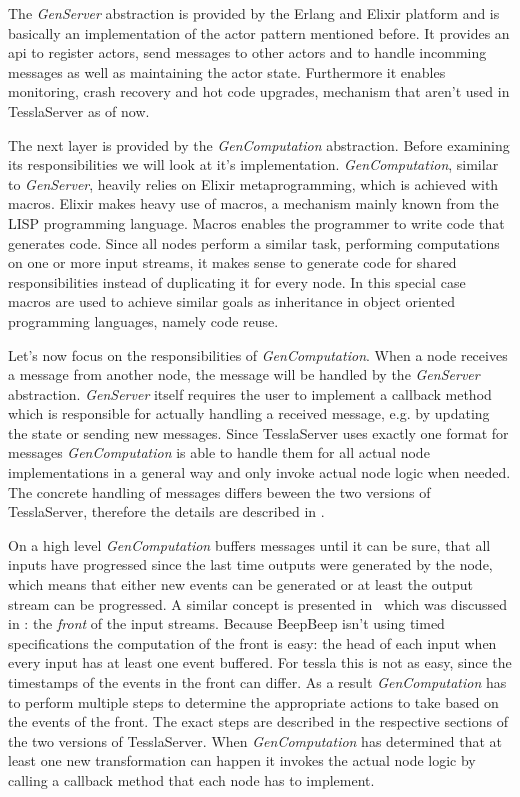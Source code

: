 The \emph{GenServer} abstraction is provided by the Erlang and Elixir platform and is basically an implementation of the actor pattern mentioned before.
It provides an \gls{api} to register actors, send messages to other actors and to handle incomming messages as well as maintaining the actor state.
Furthermore it enables monitoring, crash recovery and hot code upgrades, mechanism that aren't used in TesslaServer as of now.

The next layer is provided by the \emph{GenComputation} abstraction.
Before examining its responsibilities we will look at it's implementation.
\emph{GenComputation}, similar to \emph{GenServer}, heavily relies on Elixir metaprogramming, which is achieved with macros.
Elixir makes heavy use of macros, a mechanism mainly known from the LISP programming language.
Macros enables the programmer to write code that generates code.
Since all nodes perform a similar task, performing computations on one or more input streams, it makes sense to generate code for shared responsibilities instead of duplicating it for every node.
In this special case macros are used to achieve similar goals as inheritance in object oriented programming languages, namely code reuse.

Let's now focus on the responsibilities of \emph{GenComputation}.
When a node receives a message from another node, the message will be handled by the \emph{GenServer} abstraction.
\emph{GenServer} itself requires the user to implement a callback method which is responsible for actually handling a received message, e.g. by updating the state or sending new messages.
Since TesslaServer uses exactly one format for messages \emph{GenComputation} is able to handle them for all actual node implementations in a general way and only invoke actual node logic when needed.
The concrete handling of messages differs beween the two versions of TesslaServer, therefore the details are described in .

On a high level \emph{GenComputation} buffers messages until it can be sure, that all inputs have progressed since the last time outputs were generated by the node, which means that either new events can be generated or at least the output stream can be progressed.
A similar concept is presented in~\cite{TODOBEEPBEEP} which was discussed in : the \emph{front} of the input streams.
Because BeepBeep isn't using timed specifications the computation of the front is easy: the head of each input when every input has at least one event buffered.
For \gls{tessla} this is not as easy, since the timestamps of the events in the front can differ.
As a result \emph{GenComputation} has to perform multiple steps to determine the appropriate actions to take based on the events of the front.
The exact steps are described in the respective sections of the two versions of TesslaServer.
When \emph{GenComputation} has determined that at least one new transformation can happen it invokes the actual node logic by calling a callback method that each node has to implement.

